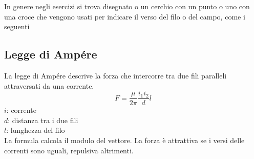 In genere negli esercizi si trova disegnato o un cerchio con un punto o uno con una croce che
vengono usati per indicare il verso del filo o del campo, come i seguenti

\begin{center}
\end{center}

\subsection{Legge di Ampére}
La legge di Ampére descrive la forza che intercorre tra due fili paralleli attraversati da una
corrente.
\begin{equation*}
  F = \frac{\mu}{2\pi}\frac{i_1i_2}{d}l
\end{equation*}
$i$: corrente\\
$d$: distanza tra i due fili\\
$l$: lunghezza del filo\\ [\baselineskip]
La formula calcola il modulo del vettore. La forza è attrattiva se i versi delle correnti sono 
uguali, repulsiva altrimenti.

